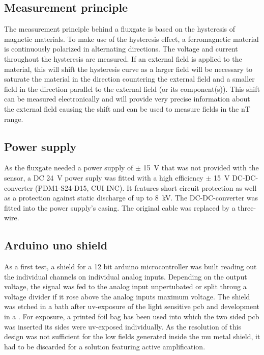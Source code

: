         \subsection{Measurement principle}
            The measurement principle behind a fluxgate is based on the hysteresis of magnetic materials. To make use of the hysteresis effect, a ferromagnetic material is continuously polarized in alternating directions. The voltage and current throughout the hysteresis are measured. If an external field is applied to the material, this will shift the hysteresis curve as a larger field will be necessary to saturate the material in the direction countering the external field and a smaller field in the direction parallel to the external field (or its component(s)). This shift can be measured electronically and will provide very precise information about the external field causing the shift and can be used to measure fields in the \si{\nano\tesla} range.
        \subsection{Power supply}
            As the fluxgate needed a power supply of $\pm$ \SI{15}{\volt} that was not provided with the sensor, a DC \SI{24}{\volt} power suply was fitted with a high efficiency $\pm$ \SI{15}{\volt} DC-DC-converter (PDM1-S24-D15, CUI INC). It features short circuit protection as well as a protection against static discharge of up to \SI{8}{\kilo\volt}. The DC-DC-converter was fitted into the power supply's casing. The original cable was replaced by a three-wire.
        \subsection{Arduino uno shield}
            As a first test, a shield for a 12 bit arduino microcontroller was built reading out the individual channels on individual analog inputs.  Depending on the output voltage, the signal was fed to the analog input unpertubated or split throug a voltage divider if it rose above the analog inputs maximum voltage.  The shield was etched in a  bath after uv-exposure of the light sensitive pcb and development in a .  For exposure, a printed foil bag has been used into which the two sided pcb was inserted  its sides were uv-exposed individually.  As the resolution of this design was not sufficient for the low fields generated inside the mu metal shield, it had to be discarded for a solution featuring active amplification.
